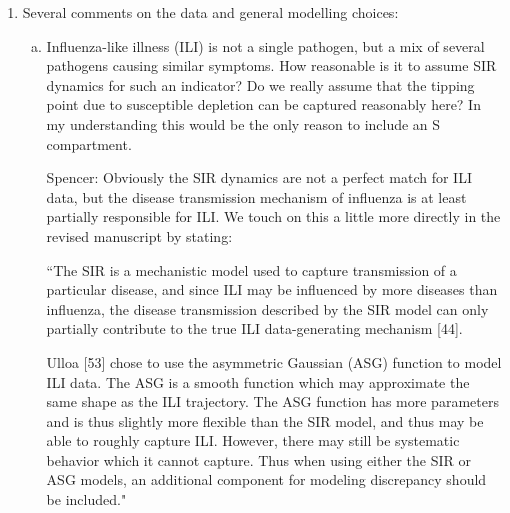 \documentclass{article}
\newcommand{\spencer}[1]{{\color{blue} Spencer: #1}}
\begin{document}
\begin{enumerate}[1.]
\begin{enumerate}[a.]
\item Also, it should be argued explicitly why this approach was chosen over a standard fully
Bayesian approach in the setting at hand. Was a fully Bayesian approach also explored? Which
difficulties were encountered?

\spencer{See response to comment 1b.}

\item Notably it would be helpful to comment on how this approach affects the uncertainty
propagation / overall quantification of forecast uncertainty.

\spencer{See response to comment 1b.}

\end{enumerate}


\item Several comments on the data and general modelling choices:

\begin{enumerate}[a.]
\item Influenza-like illness (ILI) is not a single pathogen, but a mix of several pathogens causing
similar symptoms. How reasonable is it to assume SIR dynamics for such an indicator? Do we
really assume that the tipping point due to susceptible depletion can be captured reasonably here? In
my understanding this would be the only reason to include an S compartment.

\spencer{Obviously the SIR dynamics are not a perfect match for ILI data, but
the disease transmission mechanism of influenza is at least partially 
responsible for ILI. We touch on this a little more directly in the revised 
manuscript by stating:

``The SIR is a mechanistic model used to capture transmission of a particular
disease, and since ILI may be influenced by more 
diseases than influenza, the disease transmission described by the SIR model
can only partially contribute to the true ILI data-generating mechanism
[44].

Ulloa [53]
chose to use the asymmetric Gaussian (ASG) function to model ILI data.
The ASG is a smooth function which may approximate the 
same shape as the ILI trajectory.
The ASG function has more parameters and is thus slightly more flexible than
the SIR model, and thus may be able to roughly capture ILI.
However, there may still be 
systematic behavior which it cannot capture. Thus when using either the SIR
or ASG models, an additional component for modeling discrepancy should be 
included."

}
\end{enumerate}
\end{enumerate}
\end{document}
